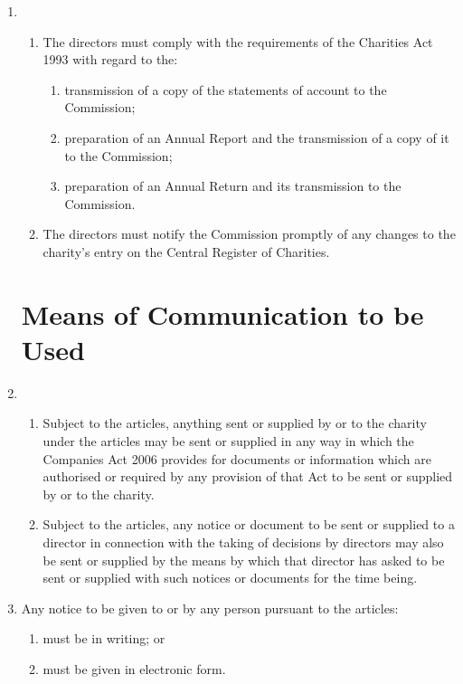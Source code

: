 \begin{enumerate}
\item
  \begin{enumerate}
  \item
    The directors must comply with the requirements of the Charities
    Act 1993 with regard to the:
    \begin{enumerate}
    \item
      transmission of a copy of the statements of account to the
      Commission;
    \item
      preparation of an Annual Report and the transmission of a copy of
      it to the Commission;
    \item
      preparation of an Annual Return and its transmission to the
      Commission.
    \end{enumerate}
  \item
    The directors must notify the Commission promptly of any changes to
    the charity's entry on the Central Register of Charities.
  \end{enumerate}

\section{Means of Communication to be Used}

\item
  \begin{enumerate}
  \item
    Subject to the articles, anything sent or supplied by or to the
    charity under the articles may be sent or supplied in any way in
    which the Companies Act 2006 provides for documents or information
    which are authorised or required by any provision of that Act to be
    sent or supplied by or to the charity.
  \item
    Subject to the articles, any notice or document to be sent or
    supplied to a director in connection with the taking of decisions
    by directors may also be sent or supplied by the means by which
    that director has asked to be sent or supplied with such notices or
    documents for the time being.
  \end{enumerate}
\item
  Any notice to be given to or by any person pursuant to the
  articles:
  \begin{enumerate}
  \item
    must be in writing; or
  \item
    must be given in electronic form.
  \end{enumerate}


\end{enumerate}
